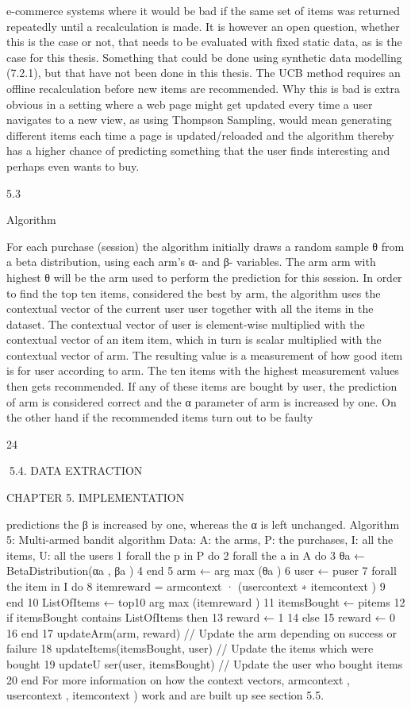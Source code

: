 e-commerce systems where it would be bad if the same set of items was returned repeatedly until a recalculation is made. It is however an open question, whether this is the
case or not, that needs to be evaluated with fixed static data, as is the case for this thesis. Something that could be done using synthetic data modelling (7.2.1), but that have
not been done in this thesis. The UCB method requires an offline recalculation before
new items are recommended. Why this is bad is extra obvious in a setting where a web
page might get updated every time a user navigates to a new view, as using Thompson
Sampling, would mean generating different items each time a page is updated/reloaded
and the algorithm thereby has a higher chance of predicting something that the user
finds interesting and perhaps even wants to buy.

5.3

Algorithm

For each purchase (session) the algorithm initially draws a random sample θ from a beta
distribution, using each arm’s α- and β- variables. The arm arm with highest θ will
be the arm used to perform the prediction for this session. In order to find the top
ten items, considered the best by arm, the algorithm uses the contextual vector of the
current user user together with all the items in the dataset. The contextual vector of
user is element-wise multiplied with the contextual vector of an item item, which in
turn is scalar multiplied with the contextual vector of arm. The resulting value is a
measurement of how good item is for user according to arm. The ten items with the
highest measurement values then gets recommended. If any of these items are bought
by user, the prediction of arm is considered correct and the α parameter of arm is
increased by one. On the other hand if the recommended items turn out to be faulty

24

5.4. DATA EXTRACTION

CHAPTER 5. IMPLEMENTATION

predictions the β is increased by one, whereas the α is left unchanged.
Algorithm 5: Multi-armed bandit algorithm
Data: A: the arms, P: the purchases, I: all the items, U: all the users
1 forall the p in P do
2
forall the a in A do
3
θa ← BetaDistribution(αa , βa )
4
end
5
arm ← arg max (θa )
6
user ← puser
7
forall the item in I do
8
itemreward = armcontext · (usercontext ∗ itemcontext )
9
end
10
ListOfItems ← top10 arg max (itemreward )
11
itemsBought ← pitems
12
if itemsBought contains ListOfItems then
13
reward ← 1
14
else
15
reward ← 0
16
end
17
updateArm(arm, reward) // Update the arm depending on success or failure
18
updateItems(itemsBought, user) // Update the items which were bought
19
updateU ser(user, itemsBought) // Update the user who bought items
20 end
For more information on how the context vectors, armcontext , usercontext , itemcontext )
work and are built up see section 5.5.

